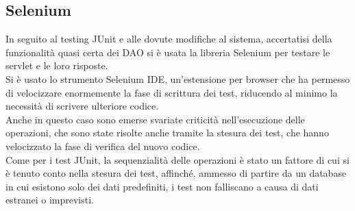 \documentclass[12pt]{article}
\begin{document}
\subsection{Selenium}
In seguito al testing JUnit e alle dovute modifiche al sistema, accertatisi della funzionalità quasi certa dei DAO si è usata la libreria Selenium per testare le servlet e le loro risposte. \\
Si è usato lo strumento Selenium IDE, un'estensione per browser che ha permesso di velocizzare enormemente la fase di scrittura dei test, riducendo al minimo la necessità di scrivere ulteriore codice. \\

Anche in questo caso sono emerse svariate criticità nell'esecuzione delle operazioni, che sono state risolte anche tramite la stesura dei test, che hanno velocizzato la fase di verifica del nuovo codice. \\
Come per i test JUnit, la sequenzialità delle operazioni è stato un fattore di cui si è tenuto conto nella stesura dei test, affinché, ammesso di partire da un database in cui esistono solo dei dati predefiniti, i test non falliscano a causa di dati estranei o imprevisti.

\newpage
\end{document}
